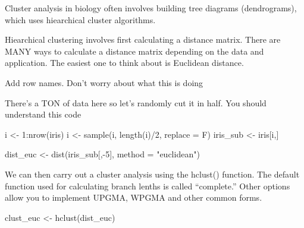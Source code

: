 \documentclass[
]{book}
\newenvironment{Shaded}{\begin{snugshade}}{\end{snugshade}}
\newcommand{\AttributeTok}[1]{\textcolor[rgb]{0.77,0.63,0.00}{#1}}
\newcommand{\DecValTok}[1]{\textcolor[rgb]{0.00,0.00,0.81}{#1}}
\newcommand{\FunctionTok}[1]{\textcolor[rgb]{0.00,0.00,0.00}{#1}}
\newcommand{\NormalTok}[1]{#1}
\newcommand{\OtherTok}[1]{\textcolor[rgb]{0.56,0.35,0.01}{#1}}
\newcommand{\SpecialCharTok}[1]{\textcolor[rgb]{0.00,0.00,0.00}{#1}}
\newcommand{\StringTok}[1]{\textcolor[rgb]{0.31,0.60,0.02}{#1}}
\begin{document}
Cluster analysis in biology often involves building tree diagrams (dendrograms), which uses hiearchical cluster algorithms.

Hiearchical clustering involves first calculating a distance matrix. There are MANY ways to calculate a distance matrix depending on the data and application. The easiest one to think about is Euclidean distance.

Add row names. Don't worry about what this is doing

\begin{Shaded}
\end{Shaded}

There's a TON of data here so let's randomly cut it in half. You should understand this code

\begin{Shaded}
\begin{Highlighting}[]
\NormalTok{i }\OtherTok{\textless{}{-}} \DecValTok{1}\SpecialCharTok{:}\FunctionTok{nrow}\NormalTok{(iris)}
\NormalTok{i }\OtherTok{\textless{}{-}} \FunctionTok{sample}\NormalTok{(i, }\FunctionTok{length}\NormalTok{(i)}\SpecialCharTok{/}\DecValTok{2}\NormalTok{, }\AttributeTok{replace =}\NormalTok{ F)}
\NormalTok{iris\_sub }\OtherTok{\textless{}{-}}\NormalTok{ iris[i,]}
\end{Highlighting}
\end{Shaded}

\begin{Shaded}
\begin{Highlighting}[]
\NormalTok{dist\_euc }\OtherTok{\textless{}{-}} \FunctionTok{dist}\NormalTok{(iris\_sub[,}\SpecialCharTok{{-}}\DecValTok{5}\NormalTok{], }
                 \AttributeTok{method =} \StringTok{"euclidean"}\NormalTok{)}
\end{Highlighting}
\end{Shaded}

We can then carry out a cluster analysis using the hclust() function. The default function used for calculating branch lenths is called ``complete.'' Other options allow you to implement UPGMA, WPGMA and other common forms.

\begin{Shaded}
\begin{Highlighting}[]
\NormalTok{clust\_euc }\OtherTok{\textless{}{-}} \FunctionTok{hclust}\NormalTok{(dist\_euc)}
\end{Highlighting}
\end{Shaded}
\end{document}
